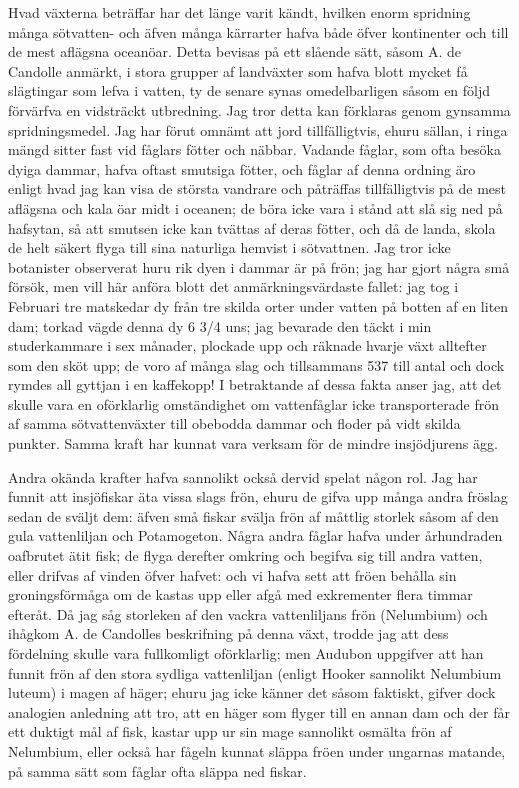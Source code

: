 Hvad växterna beträffar har det länge varit kändt, hvilken enorm spridning många sötvatten- och äfven många kärrarter hafva både öfver kontinenter och till de mest aflägsna oceanöar. Detta bevisas på ett slående sätt, såsom A. de Candolle anmärkt, i stora grupper af landväxter som hafva blott mycket få slägtingar som lefva i vatten, ty de senare synas omedelbarligen såsom en följd förvärfva en vidsträckt utbredning. Jag tror detta kan förklaras genom gynsamma spridningsmedel. Jag har förut omnämt att jord tillfälligtvis, ehuru sällan, i ringa mängd sitter fast vid fåglars fötter och näbbar. Vadande fåglar, som ofta besöka dyiga dammar, hafva oftast smutsiga fötter, och fåglar af denna ordning äro enligt hvad jag kan visa de största vandrare och påträffas tillfälligtvis på de mest aflägsna och kala öar midt i oceanen; de böra icke vara i stånd att slå sig ned på hafsytan, så att smutsen icke kan tvättas af deras fötter, och då de landa, skola de helt säkert flyga till sina naturliga hemvist i sötvattnen. Jag tror icke botanister observerat huru rik dyen i dammar är på frön; jag har gjort några små försök, men vill här anföra blott det anmärkningsvärdaste fallet: jag tog i Februari tre matskedar dy från tre skilda orter under vatten på botten af en liten dam; torkad vägde denna dy 6 3/4 uns; jag bevarade den täckt i min studerkammare i sex månader, plockade upp och räknade hvarje växt alltefter som den sköt upp; de voro af många slag och tillsammans 537 till antal och dock rymdes all gyttjan i en kaffekopp! I betraktande af dessa fakta anser jag, att det skulle vara en oförklarlig omständighet om vattenfåglar icke transporterade frön af samma sötvattenväxter till obebodda dammar och floder på vidt skilda punkter. Samma kraft har kunnat vara verksam för de mindre insjödjurens ägg.

Andra okända krafter hafva sannolikt också dervid spelat någon rol. Jag har funnit att insjöfiskar äta vissa slags frön, ehuru de gifva upp många andra fröslag sedan de sväljt dem: äfven små fiskar svälja frön af måttlig storlek såsom af den gula vattenliljan och Potamogeton. Några andra fåglar hafva under århundraden oafbrutet ätit fisk; de flyga derefter omkring och begifva sig till andra vatten, eller drifvas af vinden öfver hafvet: och vi hafva sett att fröen behålla sin groningsförmåga om de kastas upp eller afgå med exkrementer flera timmar efteråt. Då jag såg storleken af den vackra vattenliljans frön (Nelumbium) och ihågkom A. de Candolles beskrifning på denna växt, trodde jag att dess fördelning skulle vara fullkomligt oförklarlig; men Audubon uppgifver att han funnit frön af den stora sydliga vattenliljan (enligt Hooker sannolikt Nelumbium luteum) i magen af häger; ehuru jag icke känner det såsom faktiskt, gifver dock analogien anledning att tro, att en häger som flyger till en annan dam och der får ett duktigt mål af fisk, kastar upp ur sin mage sannolikt osmälta frön af Nelumbium, eller också har fågeln kunnat släppa fröen under ungarnas matande, på samma sätt som fåglar ofta släppa ned fiskar.

